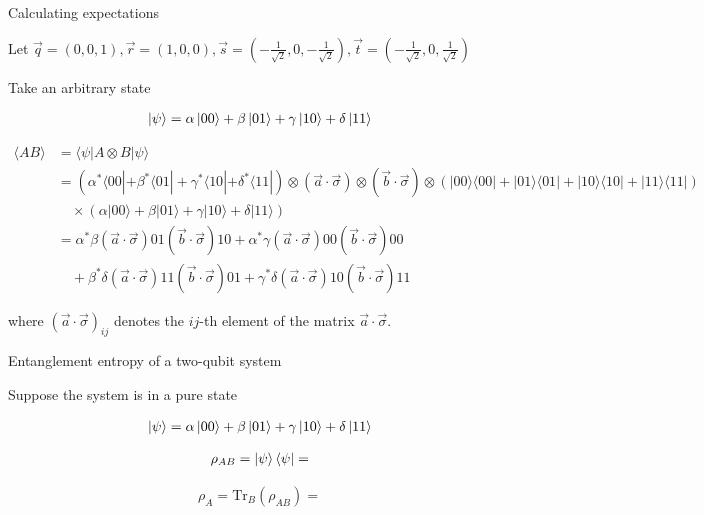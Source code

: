 \documentclass[aspectratio=1610]{beamer}					%
\begin{document}
\begin{frame}{Calculating expectations}

Let $\vec{q} = (0,0,1), \vec{r} = (1,0,0), \vec{s} = (-\frac{1}{\sqrt{2}},0,-\frac{1}{\sqrt{2}}), \vec{t} = (-\frac{1}{\sqrt{2}},0,\frac{1}{\sqrt{2}})$

Take an arbitrary state

\begin{align*}
\ket{\psi} = \alpha\ket{00} + \beta\ket{01} + \gamma\ket{10} + \delta\ket{11}
\end{align*}


\begin{align*}
\langle AB \rangle &= \langle \psi | A \otimes B | \psi \rangle \\
&= (\alpha^* \langle 00 | + \beta^* \langle 01 | + \gamma^* \langle 10 | + \delta^* \langle 11 |) \otimes (\vec{a} \cdot \vec{\sigma}) \otimes (\vec{b} \cdot \vec{\sigma}) \otimes (|00 \rangle \langle 00| + |01 \rangle \langle 01| + |10 \rangle \langle 10| + |11 \rangle \langle 11|) \\
&\quad \times (\alpha |00\rangle + \beta |01\rangle + \gamma |10\rangle + \delta |11\rangle) \\
&= \alpha^* \beta (\vec{a} \cdot \vec{\sigma}){01} (\vec{b} \cdot \vec{\sigma}){10} + \alpha^* \gamma (\vec{a} \cdot \vec{\sigma}){00} (\vec{b} \cdot \vec{\sigma}){00} \\
&\quad + \beta^* \delta (\vec{a} \cdot \vec{\sigma}){11} (\vec{b} \cdot \vec{\sigma}){01} + \gamma^* \delta (\vec{a} \cdot \vec{\sigma}){10} (\vec{b} \cdot \vec{\sigma}){11}
\end{align*}

where $(\vec{a} \cdot \vec{\sigma})_{ij}$ denotes the $ij$-th element of the matrix $\vec{a} \cdot \vec{\sigma}$.


\end{frame}

\begin{frame}{Entanglement entropy of a two-qubit system}

Suppose the system is in a pure state

\begin{align*}
\ket{\psi} = \alpha\ket{00} + \beta\ket{01} + \gamma\ket{10} + \delta\ket{11}
\end{align*}

\begin{align*}
\rho_{AB} = \ket{\psi}\bra{\psi} = 
\end{align*}


\begin{align*}
\rho_{A} = \mathrm{Tr}_{B}(\rho_{AB}) = 
\end{align*}

\end{frame}
\end{document}
